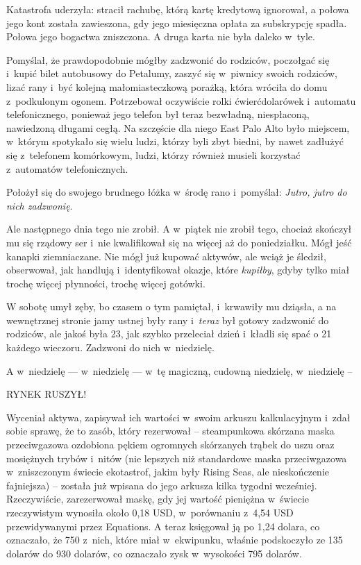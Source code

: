 \documentclass[oneside,polish,11pt,rmheadings]{mwbk}
\begin{document}
Katastrofa uderzyła: stracił rachubę, którą kartę kredytową ignorował, a połowa jego kont została zawieszona, gdy jego miesięczna opłata za subskrypcję spadła. Połowa jego bogactwa zniszczona. A druga karta nie była daleko w~tyle.

Pomyślał, że prawdopodobnie mógłby zadzwonić do rodziców, poczołgać się i~kupić bilet autobusowy do Petalumy, zaszyć się w~piwnicy swoich rodziców, lizać rany i~być kolejną małomiasteczkową porażką, która wróciła do domu z~podkulonym ogonem. Potrzebował oczywiście rolki ćwierćdolarówek i~automatu telefonicznego, ponieważ jego telefon był teraz bezwładną, niespłaconą, nawiedzoną długami cegłą. Na szczęście dla niego East Palo Alto było miejscem, w~którym spotykało się wielu ludzi, którzy byli zbyt biedni, by nawet zadłużyć się z~telefonem komórkowym, ludzi, którzy również musieli korzystać z~automatów telefonicznych.

Położył się do swojego brudnego łóżka w~środę rano i~pomyślał: \textit{Jutro, jutro do nich zadzwonię}. 

Ale następnego dnia tego nie zrobił. A w~piątek nie zrobił tego, chociaż skończył mu się rządowy ser i~nie kwalifikował się na więcej aż do poniedziałku. Mógł jeść kanapki ziemniaczane. Nie mógł już kupować aktywów, ale wciąż je śledził, obserwował, jak handlują i~identyfikował okazje, które \textit{kupiłby}, gdyby tylko miał trochę więcej płynności, trochę więcej gotówki.

W sobotę umył zęby, bo czasem o tym pamiętał, i~krwawiły mu dziąsła, a na wewnętrznej stronie jamy ustnej były rany i~\textit{teraz }był gotowy zadzwonić do rodziców, ale jakoś była 23, jak szybko przeleciał dzień i~kładli się spać o 21 każdego wieczoru. Zadzwoni do nich w~niedzielę.

A w~niedzielę --- w~niedzielę --- w~tę magiczną, cudowną niedzielę, w~niedzielę --

RYNEK RUSZYŁ!

Wyceniał aktywa, zapisywał ich wartości w~swoim arkuszu kalkulacyjnym i~zdał sobie sprawę, że to zasób, który rezerwował -- steampunkowa skórzana maska przeciwgazowa ozdobiona pękiem ogromnych skórzanych trąbek do uszu oraz mosiężnych trybów i~nitów (nie lepszych niż standardowe maska przeciwgazowa w~zniszczonym świecie ekotastrof, jakim były Rising Seas, ale nieskończenie fajniejsza) -- została już wpisana do jego arkusza kilka tygodni wcześniej. Rzeczywiście, zarezerwował maskę, gdy jej wartość pieniężna w~świecie rzeczywistym wynosiła około 0,18 USD, w~porównaniu z~4,54 USD przewidywanymi przez Equations. A teraz księgował ją po 1,24 dolara, co oznaczało, że 750 z~nich, które miał w~ekwipunku, właśnie podskoczyło ze 135 dolarów do 930 dolarów, co oznaczało zysk w~wysokości 795 dolarów.
\end{document}
